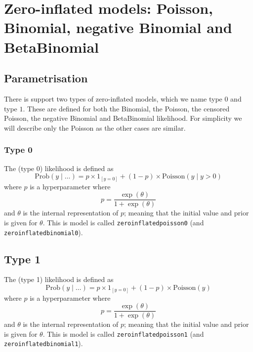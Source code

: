 \documentclass[a4paper,11pt]{article}
\begin{document}
\section*{Zero-inflated models: Poisson, Binomial, negative Binomial
    and BetaBinomial}

\subsection*{Parametrisation}

There is support two types of zero-inflated models, which we name type
$0$ and type $1$. These are defined for both the Binomial, the
Poisson, the censored Poisson, the negative Binomial and BetaBinomial
likelihood. For simplicity we will describe only the Poisson as the
other cases are similar.

\subsubsection*{Type 0}

The (type 0) likelihood is defined as
\begin{displaymath}
    \text{Prob}(y \mid \ldots ) = p \times 1_{[y=0]} +
    (1-p)\times \text{Poisson}(y \mid y > 0)
\end{displaymath}
where $p$ is a hyperparameter where
\begin{displaymath}
    p = \frac{\exp(\theta)}{1+\exp(\theta)}
\end{displaymath}
and $\theta$ is the internal representation of $p$; meaning that the
initial value and prior is given for $\theta$. This is model is called
\texttt{zeroinflatedpoisson0} (and \texttt{zeroinflatedbinomial0}).

\subsection*{Type 1}

The (type 1) likelihood is defined as
\begin{displaymath}
    \text{Prob}(y \mid \ldots ) = p \times 1_{[y=0]} +
    (1-p)\times \text{Poisson}(y)
\end{displaymath}
where $p$ is a hyperparameter where
\begin{displaymath}
    p = \frac{\exp(\theta)}{1+\exp(\theta)}
\end{displaymath}
and $\theta$ is the internal representation of $p$; meaning that the
initial value and prior is given for $\theta$. This is model is called
\texttt{zeroinflatedpoisson1} (and \texttt{zeroinflatedbinomial1}).
\end{document}
